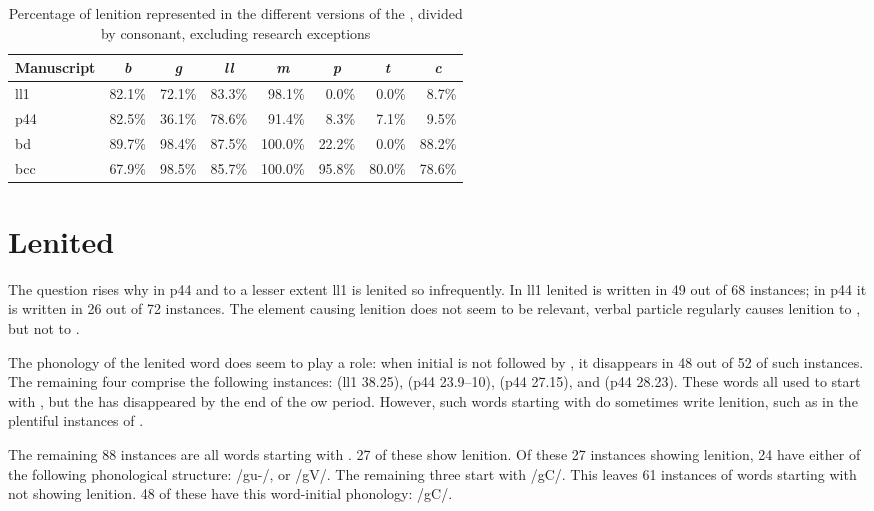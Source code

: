 \begin{table}[h]
  \centering
  \begin{tabular}{lrrrrrrr}
    \toprule
    \textbf{Manuscript} & \multicolumn{1}{c}{\textit{\textbf{b}}} & \multicolumn{1}{c}{\textit{\textbf{g}}} & \multicolumn{1}{c}{\textit{\textbf{ll}}} & \multicolumn{1}{c}{\textit{\textbf{m}}} & \multicolumn{1}{c}{\textit{\textbf{p}}} & \multicolumn{1}{c}{\textit{\textbf{t}}} & \multicolumn{1}{c}{\textit{\textbf{c}}} \\
    \midrule
    \gls{ll1} & 82.1\% & 72.1\% & 83.3\% & 98.1\% & 0.0\% & 0.0\% & 8.7\% \\
    \gls{p44} & 82.5\% & 36.1\% & 78.6\% & 91.4\% & 8.3\% & 7.1\% & 9.5\% \\
    \gls{bd} & 89.7\% & 98.4\% & 87.5\% & 100.0\% & 22.2\% & 0.0\% & 88.2\% \\
    \gls{bcc} & 67.9\% & 98.5\% & 85.7\% & 100.0\% & 95.8\% & 80.0\% & 78.6\% \\
    \bottomrule
  \end{tabular}%
  \caption{Percentage of lenition represented in the
    different versions of the , divided by consonant,
    excluding research exceptions}
  \label{tab:perlenbrutex}
\end{table}

\section{Lenited }
\label{sec:lenited-mwg}
The question rises why  in \gls{p44} and to a lesser
extent \gls{ll1} is lenited so infrequently.  In \gls{ll1}
lenited  is written in 49 out of 68 instances; in \gls{p44} it
is written in 26 out of 72 instances.  The element causing lenition
does not seem to be relevant, \eg verbal particle  regularly
causes lenition to , but not to .

The phonology of the lenited word does seem to play a role: when
initial  is not followed by , it disappears in 48 out of
52 of such instances. The remaining four comprise the following
instances:  (\gls{ll1} 38.25),
 (\gls{p44} 23.9--10), 
(\gls{p44} 27.15), and  (\gls{p44}
28.23). These words all used to start with , but the \mw{\cw}
has disappeared by the end of the \gls{ow} period. However, such words
starting with  do sometimes write lenition, such as in the
plentiful instances of .

The remaining 88 instances are all words starting with . 27 of these show lenition. Of these 27 instances showing lenition, 24 have either of the following phonological structure: /gu-/, or /g\cw V/. The remaining three start with /g\cw C/.
This leaves 61 instances of words starting with  not showing lenition. 48 of these have this word-initial phonology: /g\cw C/.




